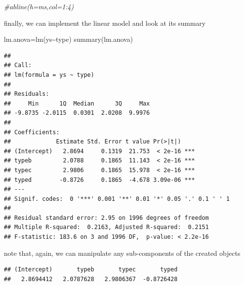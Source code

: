 \documentclass[
]{book}
\newenvironment{Shaded}{\begin{snugshade}}{\end{snugshade}}
\newcommand{\CommentTok}[1]{\textcolor[rgb]{0.56,0.35,0.01}{\textit{#1}}}
\newcommand{\DecValTok}[1]{\textcolor[rgb]{0.00,0.00,0.81}{#1}}
\newcommand{\FunctionTok}[1]{\textcolor[rgb]{0.00,0.00,0.00}{#1}}
\newcommand{\NormalTok}[1]{#1}
\newcommand{\OtherTok}[1]{\textcolor[rgb]{0.56,0.35,0.01}{#1}}
\newcommand{\SpecialCharTok}[1]{\textcolor[rgb]{0.00,0.00,0.00}{#1}}
\begin{document}
\begin{Shaded}
\begin{Highlighting}[]
\CommentTok{\#abline(h=ms,col=1:4)}
\end{Highlighting}
\end{Shaded}

finally, we can implement the linear model and look at its summary

\begin{Shaded}
\begin{Highlighting}[]
\NormalTok{lm.anova}\OtherTok{=}\FunctionTok{lm}\NormalTok{(ys}\SpecialCharTok{\textasciitilde{}}\NormalTok{type)}
\FunctionTok{summary}\NormalTok{(lm.anova)}
\end{Highlighting}
\end{Shaded}

\begin{verbatim}
## 
## Call:
## lm(formula = ys ~ type)
## 
## Residuals:
##     Min      1Q  Median      3Q     Max 
## -9.8735 -2.0115  0.0301  2.0208  9.9976 
## 
## Coefficients:
##             Estimate Std. Error t value Pr(>|t|)    
## (Intercept)   2.8694     0.1319  21.753  < 2e-16 ***
## typeb         2.0788     0.1865  11.143  < 2e-16 ***
## typec         2.9806     0.1865  15.978  < 2e-16 ***
## typed        -0.8726     0.1865  -4.678 3.09e-06 ***
## ---
## Signif. codes:  0 '***' 0.001 '**' 0.01 '*' 0.05 '.' 0.1 ' ' 1
## 
## Residual standard error: 2.95 on 1996 degrees of freedom
## Multiple R-squared:  0.2163, Adjusted R-squared:  0.2151 
## F-statistic: 183.6 on 3 and 1996 DF,  p-value: < 2.2e-16
\end{verbatim}

note that, again, we can manipulate any sub-components of the created objects

\begin{Shaded}
\end{Shaded}

\begin{verbatim}
## (Intercept)       typeb       typec       typed 
##   2.8694412   2.0787628   2.9806367  -0.8726428
\end{verbatim}

\begin{Shaded}
\end{Shaded}
\end{document}
